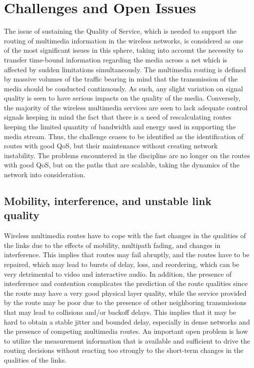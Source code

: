 \documentclass[12pt]{article}
\begin{document}
	\section{Challenges and Open Issues}
    The issue \cite{Promkotwong2007QMRP}of sustaining the Quality of Service, which is needed to support the routing of multimedia information in the wireless networks, is considered as one of the most significant issues in this sphere, taking into account the necessity to transfer time-bound information regarding the media across a net which is affected by sudden limitations simultaneously. The multimedia routing is defined by massive volumes of the traffic bearing in mind that the transmission of the media should be conducted continuously. As such, any slight variation on signal quality is seen to have serious impacts on the quality of the media. Conversely, the majority of the wireless multimedia services are seen to lack adequate control signals keeping in mind the fact that there is a need of rescalculating routes keeping the limited quantity of bandwidth and energy used in supporting the media stream. Thus, the challenge ceases to be identified as the identification of routes with good QoS, but their maintenance without creating network instability. The problems encountered in the discipline are no longer on the routes with good QoS, but on the paths that are scalable, taking the dynamics of the network into consideration.
	\subsection{Mobility, interference, and unstable link quality}
    Wireless multimedia \cite{Singal2022} routes have to cope with the fast changes in the qualities of the links due to the effects of mobility, multipath fading, and changes in interference. This implies that routes may fail abruptly, and the routes have to be repaired, which may lead to bursts of delay, loss, and reordering, which can be very detrimental to video and interactive audio. In addition, the presence of interference and contention complicates the prediction of the route qualities since the route may have a very good physical layer quality, while the service provided by the route may be poor due to the presence of other neighboring transmissions that may lead to collisions and/or backoff delays. This implies that it may be hard to obtain a stable jitter and bounded delay, especially in dense networks and the presence of competing multimedia routes. An important open problem is how to utilize the measurement information that is available and sufficient to drive the routing decisions without reacting too strongly to the short-term changes in the qualities of the links.
\end{document}
